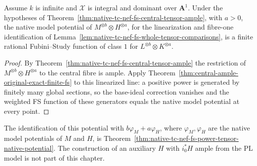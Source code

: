 \begin{theorem}
\label{thm:native-tc-nef-fs-perturbed-model-exact}
\leanok
{}
Assume $k$ is infinite and $\mathcal X$ is integral and dominant over $\mathbf A^1$.  Under
the hypotheses of Theorem~\ref{thm:native-tc-nef-fs-central-tensor-ample}, with $a>0$, the native
model potential of $M^{\otimes b}\otimes H^{\otimes a}$, for the linearization and
fibre-one identification of Lemma~\ref{lem:native-tc-nef-fs-whole-tensor-comparisons}, is a
finite rational Fubini--Study function of class $1$ for
$L^{\otimes b}\otimes K^{\otimes a}$.
\end{theorem}

\begin{proof}
By Theorem~\ref{thm:native-tc-nef-fs-central-tensor-ample} the restriction of
$M^{\otimes b}\otimes H^{\otimes a}$ to the central fibre is ample.  Apply
Theorem~\ref{thm:central-ample-original-exact-finite-fs} to this linearized line: a positive
power is generated by finitely many global sections, so the base-ideal correction
vanishes and the weighted FS function of these generators equals the native model
potential at every point.
\end{proof}

\begin{remark}
The identification of this potential with $b\varphi_M+a\varphi_H$, where
$\varphi_M,\varphi_H$ are the native model potentials of $M$ and $H$, is
Theorem~\ref{thm:native-tc-nef-fs-power-tensor-native-potential}.  The construction of an
auxiliary $H$ with $i_0^*H$ ample from the PL model is not part of this chapter.
\end{remark}
